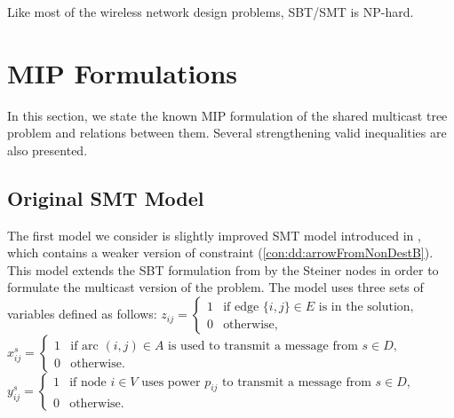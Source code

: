 Like most of the wireless network design problems, SBT/SMT is NP-hard.
\section{MIP Formulations}
\label{sec:ILP}
In this section, we state the known MIP formulation of the shared multicast tree problem and relations between them. Several strengthening valid inequalities are also presented.
\subsection{Original SMT Model}
The first model we consider is slightly improved SMT model introduced in \cite{ivanova16isco}, which contains a weaker version of constraint (\ref{con:dd:arrowFromNonDestB}). This model extends the SBT formulation from \cite{Haugland12Dual} by the Steiner nodes in order to formulate the multicast version of the problem. The model uses three sets of variables defined as follows:
\newline\newline
  $z_{ij}=
	\begin{cases}
    1 & \text{if edge $\{i,j\} \in E$ is in the solution},\\
    0 & \text{otherwise},
  \end{cases}$
\newline\newline
  $x^{s}_{ij}=
	\begin{cases}
    1 & \text{if arc $(i,j) \in A$ is used to transmit a message from $s\in D$},\\
    0 & \text{otherwise}.
  \end{cases}$
  \newline\newline
  $y^s_{ij}=
	\begin{cases}
    1 & \text{if node $i \in V$ uses power $p_{ij}$ to transmit a message from $s\in D$},\\
    0 & \text{otherwise}.
  \end{cases}$
\newline
\newline    
